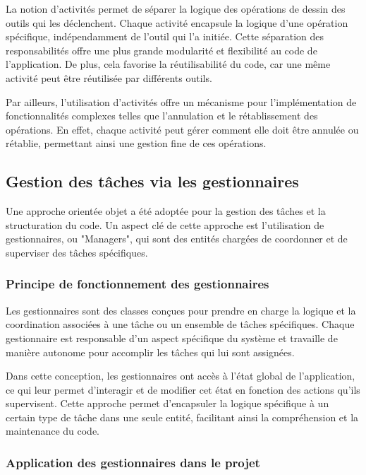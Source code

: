 La notion d'activités permet de séparer la logique des opérations de dessin des outils qui les déclenchent. Chaque activité encapsule la logique d'une opération spécifique, indépendamment de l'outil qui l'a initiée. Cette séparation des responsabilités offre une plus grande modularité et flexibilité au code de l'application. De plus, cela favorise la réutilisabilité du code, car une même activité peut être réutilisée par différents outils.

Par ailleurs, l'utilisation d'activités offre un mécanisme pour l'implémentation de fonctionnalités complexes telles que l'annulation et le rétablissement des opérations. En effet, chaque activité peut gérer comment elle doit être annulée ou rétablie, permettant ainsi une gestion fine de ces opérations.

\subsection{Gestion des tâches via les gestionnaires}

Une approche orientée objet a été adoptée pour la gestion des tâches et la structuration du code. Un aspect clé de cette approche est l'utilisation de gestionnaires, ou "Managers", qui sont des entités chargées de coordonner et de superviser des tâches spécifiques.

\subsubsection{Principe de fonctionnement des gestionnaires}

Les gestionnaires sont des classes conçues pour prendre en charge la logique et la coordination associées à une tâche ou un ensemble de tâches spécifiques. Chaque gestionnaire est responsable d'un aspect spécifique du système et travaille de manière autonome pour accomplir les tâches qui lui sont assignées.

Dans cette conception, les gestionnaires ont accès à l'état global de l'application, ce qui leur permet d'interagir et de modifier cet état en fonction des actions qu'ils supervisent. Cette approche permet d'encapsuler la logique spécifique à un certain type de tâche dans une seule entité, facilitant ainsi la compréhension et la maintenance du code.

\subsubsection{Application des gestionnaires dans le projet}

